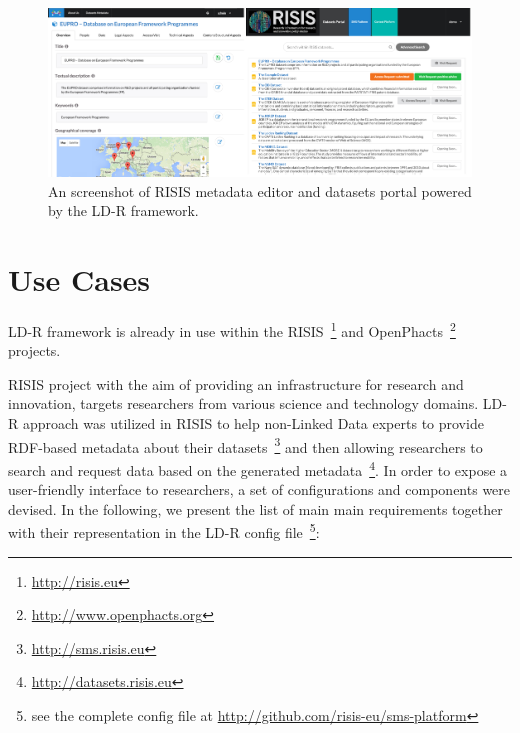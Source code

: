 \documentclass{acm_proc_article-sp}
\begin{document}
\begin{figure}[ht] 
  \includegraphics[width=1\linewidth]{images/screenshots.jpg}
  \caption{An screenshot of RISIS metadata editor and datasets portal powered by the LD-R framework.}
  \label{fig:risisScreenshot}
\end{figure}

\section{Use Cases}

LD-R framework is already in use within the RISIS~\footnote{\url{http://risis.eu}} and OpenPhacts~\footnote{\url{http://www.openphacts.org}} projects.

RISIS project with the aim of providing an infrastructure for research and innovation, targets researchers from various science and technology domains.
LD-R approach was utilized in RISIS to help non-Linked Data experts to provide RDF-based metadata about their datasets~\footnote{\url{http://sms.risis.eu}} and then allowing researchers to search and request data based on the generated metadata~\footnote{\url{http://datasets.risis.eu}}.
In order to expose a user-friendly interface to researchers, a set of configurations and components were devised. 
In the following, we present the list of main main requirements together with their representation in the LD-R config file~\footnote{see the complete config file at \url{http://github.com/risis-eu/sms-platform}}:
\end{document}
